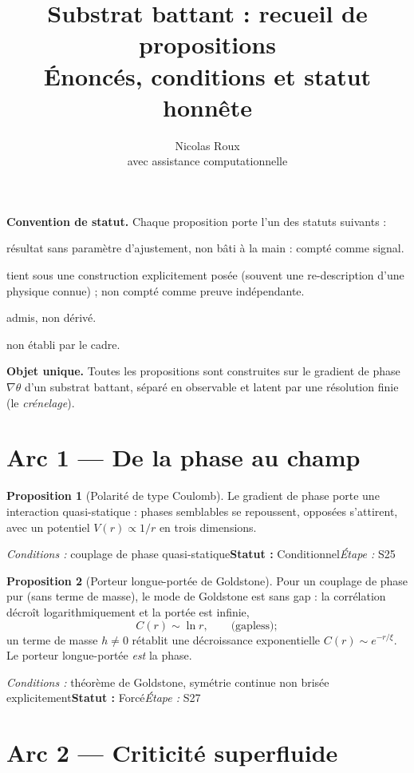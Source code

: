 \documentclass[11pt,a4paper]{article}
\title{\textbf{Substrat battant : recueil de propositions}\\[2pt]\large Énoncés, conditions et statut honnête}
\author{Nicolas Roux \\ \small avec assistance computationnelle}
\date{}
\theoremstyle{definition}
\newtheorem{prop}{Proposition}
\newcommand{\statut}[3]{\par\smallskip\noindent\textit{Conditions :} #1\quad\textbf{Statut :} #2\quad\textit{Étape :} #3\par\medskip}
\begin{document}
\maketitle

\noindent\textbf{Convention de statut.} Chaque proposition porte l'un des statuts suivants :
\begin{description}[leftmargin=2.2cm,style=nextline,itemsep=1pt]
  \item[\textbf{Forcé}] résultat sans paramètre d'ajustement, non bâti à la main : compté comme signal.
  \item[\textbf{Conditionnel}] tient sous une construction explicitement posée (souvent une re-description d'une physique connue) ; non compté comme preuve indépendante.
  \item[\textbf{Adopté}] admis, non dérivé.
  \item[\textbf{Ouvert}] non établi par le cadre.
\end{description}

\noindent\textbf{Objet unique.} Toutes les propositions sont construites sur le gradient de phase $\nabla\theta$ d'un substrat battant, séparé en observable et latent par une résolution finie (le \emph{crénelage}).

\bigskip

\section*{Arc 1 — De la phase au champ}

\begin{prop}[Polarité de type Coulomb]
Le gradient de phase porte une interaction quasi-statique : phases semblables se repoussent, opposées s'attirent, avec un potentiel $V(r)\propto 1/r$ en trois dimensions.
\end{prop}
\statut{couplage de phase quasi-statique}{Conditionnel}{S25}

\begin{prop}[Porteur longue-portée de Goldstone]
Pour un couplage de phase pur (sans terme de masse), le mode de Goldstone est sans gap : la corrélation décroît logarithmiquement et la portée est infinie,
\[ C(r)\sim \ln r,\qquad \text{(gapless)} ; \]
un terme de masse $h\neq 0$ rétablit une décroissance exponentielle $C(r)\sim e^{-r/\xi}$. Le porteur longue-portée \emph{est} la phase.
\end{prop}
\statut{théorème de Goldstone, symétrie continue non brisée explicitement}{Forcé}{S27}

\section*{Arc 2 — Criticité superfluide}
\end{document}
